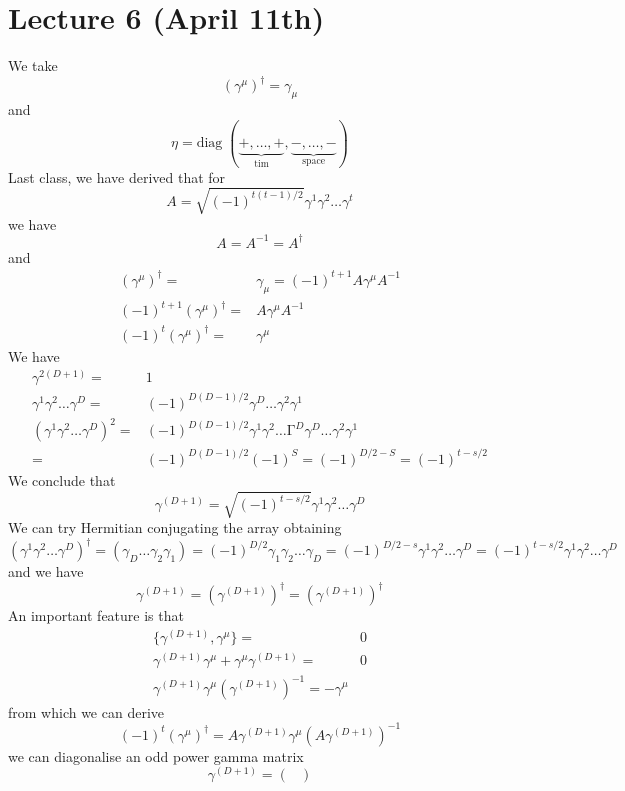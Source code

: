 \section{Lecture 6 (April 11th)}
\begin{rmk}
We take 
\[(\gamma ^{\mu })^{\dagger}=\gamma _{\mu }\]
and
\[\eta =\mathrm{diag}\;(\underbrace{+,\ldots ,+}_{\mathrm{tim}},\underbrace{-,\ldots ,-}_{\mathrm{space}})\]
Last class, we have derived that for 
\[A=\sqrt{(-1)^{t(t-1)/2}}\gamma ^{1}\gamma^{2}\ldots \gamma ^{t}\]
we have
\[A=A^{-1}=A^{\dagger}\]
and
\begin{align*}
(\gamma ^{\mu })^{\dagger}=&\gamma _{\mu }=(-1)^{t+1}A\gamma ^{\mu }A^{-1}\\
(-1)^{t+1}(\gamma ^{\mu })^{\dagger}=&A\gamma ^{\mu }A^{-1}\\
(-1)^{t}(\gamma ^{\mu })^{\dagger}=&\gamma ^{\mu }
\end{align*}
We have
\begin{align*}
\gamma ^{2(D+1)}=&1\\
\gamma ^{1}\gamma ^{2}\ldots \gamma ^{D}=&(-1)^{D(D-1)/2}\gamma ^{D}\ldots \gamma ^{2}\gamma ^{1}\\
(\gamma ^{1}\gamma ^{2}\ldots \gamma ^{D})^2=&(-1)^{D(D-1)/2}\gamma ^{1}\gamma ^{2}\ldots \mathrm{\Gamma} ^{D}\gamma^{D}\ldots \gamma ^{2}\gamma ^{1}\\
=&(-1)^{D(D-1)/2}(-1)^{S}=(-1)^{D/2-S}=(-1)^{t-s/2}
\end{align*}
We conclude that
\[\gamma ^{(D+1)}=\sqrt{(-1)^{t-s/2}}\gamma ^{1}\gamma ^{2}\ldots \gamma ^{D}\]
We can try Hermitian conjugating the array obtaining
\[(\gamma ^{1}\gamma ^{2}\ldots \gamma ^{D})^{\dagger}=(\gamma _{D}\ldots \gamma _{2}\gamma _{1})=(-1)^{D/2}\gamma _{1}\gamma _{2}\ldots \gamma _{D}=(-1)^{D/2-s}\gamma ^{1}\gamma ^{2}\ldots \gamma ^{D}=(-1)^{t-s/2}\gamma ^{1}\gamma ^{2}\ldots \gamma ^{D}\]
and we have
\[\gamma ^{(D+1)}=(\gamma ^{(D+1)})^{\dagger}=(\gamma ^{(D+1)})^{\dagger}\]
An important feature is that
\begin{align*}
\{\gamma ^{(D+1)},\gamma ^{\mu }\}=&0\\
\gamma ^{(D+1)}\gamma ^{\mu }+\gamma ^{\mu }\gamma^{(D+1)}=&0\\
\gamma ^{(D+1)}\gamma ^{\mu }(\gamma ^{(D+1)})^{-1}=-\gamma ^{\mu }
\end{align*}
from which we can derive 
\[(-1)^{t}(\gamma ^{\mu })^{\dagger}=A\gamma ^{(D+1)}\gamma ^{\mu }(A\gamma ^{(D+1)})^{-1}\]
we can diagonalise an odd power gamma matrix
\[\gamma ^{(D+1)}=\begin{pmatrix}

\end{pmatrix}\]
\end{rmk}
